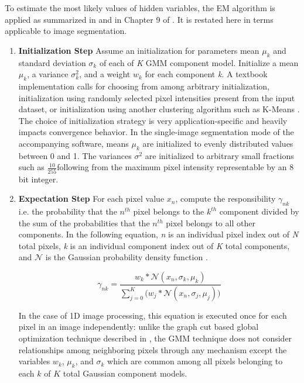 \documentclass[conference]{IEEEtran}
\begin{document}
To estimate the most likely values of hidden variables, the EM algorithm is applied as summarized in \cite{RussellNorvig} and in Chapter 9 of \cite{PRML}. It is restated here in terms applicable to image segmentation. 

\begin{enumerate}
\item \textbf{Initialization Step} Assume an initialization for parameters mean $\mu_k$ and standard deviation $\sigma_k$ of each of \emph{K} GMM component model. Initialize a mean $\mu_k$, a variance $\sigma^2_k$, and a weight $w_k$ for each component \emph{k}.  A textbook implementation calls for choosing from among arbitrary initialization, initialization using randomly selected pixel intensities present from the input dataset, or initialization using another clustering algorithm such as K-Means \cite{PRML}. The choice of initialization strategy is very application-specific and heavily impacts convergence behavior. In the single-image segmentation mode of the accompanying software, means $\mu_k$ are initialized to evenly distributed values between 0 and 1. The variances $\sigma^2$ are initialized to arbitrary small fractions such as $\frac{10}{255}$following from the maximum pixel intensity representable by an 8 bit integer. 

\item \textbf{Expectation Step} For each pixel value $x_n$, compute the responsibility $\gamma_{nk}$ i.e. the probability that the $n^{th}$ pixel belongs to the $k^{th}$ component divided by the sum of the probabilities that the $n^{th}$ pixel belongs to all other components. In the following equation, \emph{n} is an individual pixel index out of \emph{N} total pixels, \emph{k} is an individual component index out of \emph{K} total components, and $\mathcal{N}$ is the Gaussian probability density function \cite{PDF}. 
  
\begin{equation}
    \gamma_{nk} = \frac{w_k * \mathcal{N}(x_n, \sigma_k, \mu_k)}{\sum_{j=0}^{K}\Big(w_j * \mathcal{N}(x_n, \sigma_j, \mu_j)\Big)}
\end{equation}

In the case of 1D image processing, this equation is executed once for each pixel in an image independently: unlike the graph cut based global optimization technique described in \cite{GrabCut}, the GMM technique does not consider relationships among neighboring pixels through any mechanism except the variables $w_k$, $\mu_k$, and $\sigma_k$ which are common among all pixels belonging to each $k$ of $K$ total Gaussian component models. 


\end{enumerate}
\end{document}
